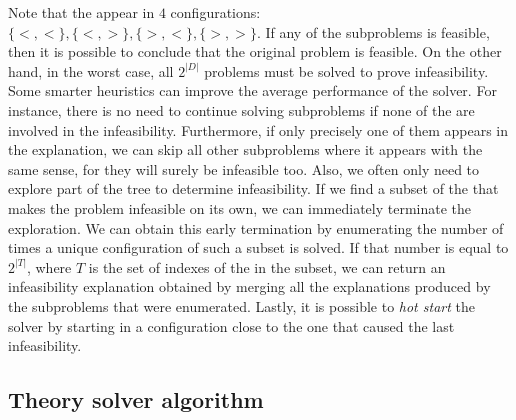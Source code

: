 \documentclass[runningheads]{llncs}
\begin{document}
Note that the \nqcs appear in $4$ configurations: $\{<, <\}, \{<, >\}, \{>, <\}, \{>, >\}$.
If any of the subproblems is feasible, then it is possible to conclude that the original problem is feasible.
On the other hand, in the worst case, all $2^{|D|}$ problems must be solved to prove infeasibility.
Some smarter heuristics can improve the average performance of the solver.
For instance, there is no need to continue solving subproblems if none of the \nqcs are involved in the infeasibility.
Furthermore, if only precisely one of them appears in the explanation, we can skip all other subproblems where it appears with the same sense, for they will surely be infeasible too.
Also, we often only need to explore part of the tree to determine infeasibility.
If we find a subset of the \nqc that makes the problem infeasible on its own, we can immediately terminate the exploration.
We can obtain this early termination by enumerating the number of times a unique configuration of such a subset is solved.
If that number is equal to $2^{|T|}$, where $T$ is the set of indexes of the \nqcs in the subset, we can return an infeasibility explanation obtained by merging all the explanations produced by the subproblems that were enumerated.
Lastly, it is possible to \textit{hot start} the solver by starting in a configuration close to the one that caused the last infeasibility.

\subsection{Theory solver algorithm}
\end{document}
